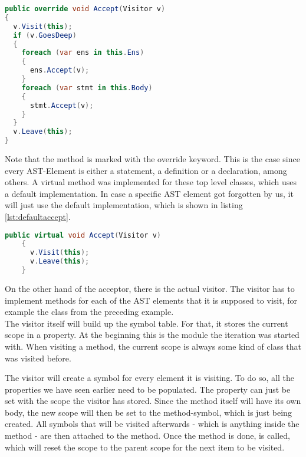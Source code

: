 \begin{lstlisting}[language=csharp, caption={Accepting a Visitor}, captionpos=b, label={lst:visitoraccept}]
public override void Accept(Visitor v)
{
  v.Visit(this);
  if (v.GoesDeep)
  {
    foreach (var ens in this.Ens)
    {
      ens.Accept(v);
    }
    foreach (var stmt in this.Body)
    {
      stmt.Accept(v);
    }
  }
  v.Leave(this);
}
\end{lstlisting}

Note that the method is marked with the override keyword.
This is the case since every AST-Element is either a statement, a definition or a declaration, among others. 
A virtual  method was implemented for these top level classes, which uses a default implementation.
In case a specific AST element got forgotten by us, it will just use the default implementation, which is shown in listing \ref{lst:defaultaccept}.

\begin{lstlisting}[language=csharp, caption={Default Accept}, captionpos=b, label={lst:defaultaccept}]
    public virtual void Accept(Visitor v)
    {
      v.Visit(this);
      v.Leave(this);
    }
\end{lstlisting}

On the other hand of the acceptor, there is the actual visitor.
The visitor has to implement  methods for each of the AST elements
that it is supposed to visit, for example the class  from the preceding example.\\

The visitor itself will build up the symbol table.
For that, it stores the current scope in a property.
At the beginning this is the module the iteration was started with.
When visiting a method, the current scope is always some kind of class that was visited before.

The visitor will create a symbol for every element it is visiting.
To do so, all the properties we have seen earlier need to be populated.
The property  can just be set with the scope the visitor has stored.
Since the method itself will have its own body, the new scope will then be set to the method-symbol, which is just being created.
All symbols that will be visited afterwards - which is anything inside the method - are then attached to the method.
Once the method is done,  is called, which will reset the scope to the parent scope for the next item to be visited.\\

